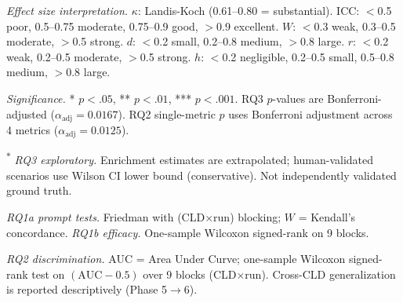 \begin{table}[H]
\begin{threeparttable}
{\begin{tabular}{llp{3.2cm}p{2.8cm}cccl}
\bottomrule
\end{tabular}}
\begin{tablenotes}
\scriptsize
\item \textit{Effect size interpretation.} $\kappa$: Landis-Koch (0.61--0.80 = substantial). ICC: $<$0.5 poor, 0.5--0.75 moderate, 0.75--0.9 good, $>$0.9 excellent. $W$: $<$0.3 weak, 0.3--0.5 moderate, $>$0.5 strong. $d$: $<$0.2 small, 0.2--0.8 medium, $>$0.8 large. $r$: $<$0.2 weak, 0.2--0.5 moderate, $>$0.5 strong. $h$: $<$0.2 negligible, 0.2--0.5 small, 0.5--0.8 medium, $>$0.8 large.
\item \textit{Significance.} * $p<.05$, ** $p<.01$, *** $p<.001$. RQ3 $p$-values are Bonferroni-adjusted ($\alpha_{\text{adj}}=0.0167$). RQ2 single-metric $p$ uses Bonferroni adjustment across 4 metrics ($\alpha_{\text{adj}}=0.0125$).
\item \textsuperscript{$\ast$} \textit{RQ3 exploratory.} Enrichment estimates are extrapolated; human-validated scenarios use Wilson CI lower bound (conservative). Not independently validated ground truth.
\item \textit{RQ1a prompt tests.} Friedman with (CLD$\times$run) blocking; $W$ = Kendall's concordance. \textit{RQ1b efficacy.} One-sample Wilcoxon signed-rank on 9 blocks.
\item \textit{RQ2 discrimination.} AUC = Area Under Curve; one-sample Wilcoxon signed-rank test on $(\mathrm{AUC}-0.5)$ over 9 blocks (CLD$\times$run). Cross-CLD generalization is reported descriptively (Phase 5$\to$6).
\end{tablenotes}
\end{threeparttable}
\end{table}